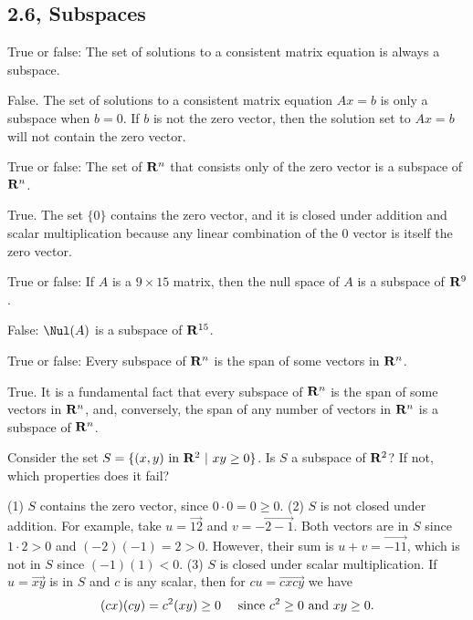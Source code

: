 \subsection{2.6, Subspaces}
\begin{problems}
%
\problem %
True or false: The set of solutions to a consistent matrix equation is 
always a subspace.

\begin{solution}
False.  The set of solutions to a consistent matrix equation $Ax = b$ is 
only a subspace when $b=0$.  If $b$ is not the zero vector, then the 
solution set to $Ax = b$ will not contain the zero vector.
\end{solution}

\problem %
True or false: The set of ${\bf R}^n$ that consists only of the zero 
vector is a subspace of ${\bf R}^n$. 

\begin{solution}
True.  The set $\{0\}$ contains the zero vector, and it is closed under 
addition and scalar multiplication because any linear combination of the 
$0$ vector is itself the zero vector.
\end{solution}

\problem 
True or false: If $A$ is a $9 \times 15$ matrix, then the null space of 
$A$ is a subspace of ${\bf R}^9$.  

\begin{solution}
    False: $\Nul(A)$ is a subspace of ${\bf R}^{15}$.
\end{solution}

\problem 
True or false: Every subspace of ${\bf R}^n$ is the span of some
  vectors in ${\bf R}^n$.

\begin{solution}
True.  It is a fundamental fact that every subspace of
    ${\bf R}^n$ is the span of some vectors in ${\bf R}^n$, and,
    conversely, the span of any number of vectors in ${\bf R}^n$ is a
    subspace of ${\bf R}^n$.
\end{solution}

\problem %
Consider the set $S = \{(x, y) \textup{ in } {\bf R}^2 \ | \ xy \geq 0\}$.  Is
$S$ a subspace of ${\bf R}^2$?  If not, which properties does it fail?

\begin{solution}
  (1) $S$ contains the zero vector, since $0\cdot 0 = 0 \geq 0$.  \newline %
  (2) $S$ is not closed under addition.  For example, take $u = \vec{1 2}$ and
  $v = \vec{-2 -1}$.  Both vectors are in $S$ since $1\cdot 2 > 0$ and
  $(-2)(-1) = 2 >0$.  However, their sum is $u+v = \vec{-1 1}$, which is not in
  $S$ since $(-1)(1)<0$.  \newline %
  (3) $S$ is closed under scalar multiplication.  If $u = \vec{x y}$ is in $S$
  and $c$ is any scalar, then for $cu = \vec{cx cy}$ we have
    \[(cx)(cy) = c^2 (xy) \geq 0 \quad \textup{ since } c^2 \geq 0 \textup{ and } xy \geq 0.\]


\end{solution}
\end{problems}
